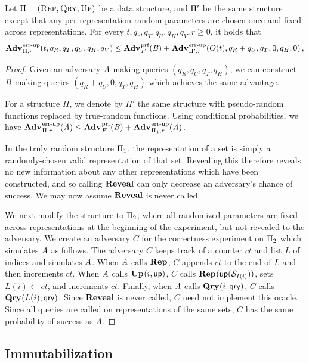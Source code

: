 \begin{lemma}[]\label{lemma:immutabletomutable}
  Let $\mathrm{\Pi} = (\textsc{Rep}, \textsc{Qry}, \textsc{Up})$ be a data structure, and $\mathrm{\Pi}'$ be the same structure except that any per-representation random parameters are chosen once and fixed across representations. For every $t, q_r, q_T, q_U, q_H, q_V, r \geq 0$, it holds that
  \[
    \Adv{\errep}_{\struct,r}(t, q_R, q_T, q_U, q_H, q_V) \leq
    \Adv{\prf}_F(\advB) + \Adv{\errep}_{\struct',r}(O(t), q_R + q_U, q_T, 0, q_H, 0) \,,
  \]
\end{lemma}
\begin{proof}
Given an adversary $\mathit{A}$ making queries $(q_R, q_U, q_T, q_H)$, we can construct $\mathit{B}$ making queries $(q_R+q_U, 0, q_T, q_H)$ which achieves the same advantage.

For a structure $\Pi$, we denote by $\Pi'$ the same structure with pseudo-random functions replaced by true-random functions. Using conditional probabilities, we have $\Adv{\errep}_{\struct,r}(\advA) \le \Adv{\prf}_F(\advB) + \Adv{\errep}_{\struct_1,r}(\advA)$.

In the truly random structure $\mathrm{\Pi}_1$, the representation of a set is simply a randomly-chosen valid representation of that set. Revealing this therefore reveals no new information about any other representations which have been constructed, and so calling $\mathbf{Reveal}$ can only decrease an adversary's chance of success. We may now assume $\mathbf{Reveal}$ is never called.

We next modify the structure to $\mathrm{\Pi}_2$, where all randomized parameters are fixed across representations at the beginning of the experiment, but not revealed to the adversary. We create an adversary $C$ for the correctness experiment on $\mathrm{\Pi}_2$ which simulates $\mathit{A}$ as follows. The adversary $C$ keeps track of a counter $ct$ and list $L$ of indices and simulates $\mathit{A}$. When $\mathit{A}$ calls $\mathbf{Rep}\hspace{0.5pt}$, $C$ appends $ct$ to the end of $L$ and then increments $ct$. When $\mathit{A}$ calls $\mathbf{Up}\hspace{0.5pt}(i,\mathsf{up})$, $C$ calls $\mathbf{Rep}\hspace{0.5pt}(\mathsf{up}(\mathcal{S}_{I(i)}))$, sets $L(i) \gets ct$, and increments $ct$. Finally, when $\mathit{A}$ calls $\mathbf{Qry}\hspace{0.5pt}(i,\mathsf{qry})$, $C$ calls $\mathbf{Qry}\hspace{0.5pt}(L(i),\mathsf{qry})$. Since $\mathbf{Reveal}$ is never called, $C$ need not implement this oracle. Since all queries are called on representations of the same sets, $C$ has the same probability of success as $A$.
\end{proof}

\subsection{Immutabilization}

